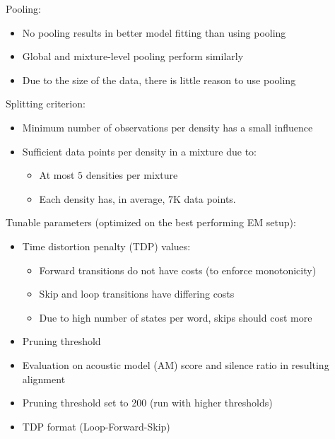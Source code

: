\documentclass[11pt, a4paper, landscape]{article}
\begin{document}
\NewPage{}
\vfill
Pooling:
\begin{itemize}
	\item No pooling results in better model fitting than using pooling 
	\item Global and mixture-level pooling perform similarly 
  \item Due to the size of the data, there is little reason to use pooling
\end{itemize}
\vspace{20pt}
Splitting criterion:
\begin{itemize}
	\item Minimum number of observations per density has a small influence
	\item Sufficient data points per density in a mixture due to:
	\begin{itemize}
		\item At most $5$ densities per mixture
		\item Each density has, in average, $7$K data points.
	\end{itemize}
\end{itemize}
\vfill

\NewPage{}
\vfill
Tunable parameters (optimized on the best performing EM setup):
\begin{itemize}
	\item Time distortion penalty (TDP) values:
    \begin{itemize}
      \item Forward transitions do not have costs (to enforce monotonicity)
      \item Skip and loop transitions have differing costs
      \item Due to high number of states per word, skips should cost more
    \end{itemize}
	\item Pruning threshold
\end{itemize}
\vfill

\NewPage{}
\vfill
\begin{itemize}
  \item Evaluation on acoustic model (AM) score and silence ratio in resulting alignment
  \item Pruning threshold set to 200 (run with higher thresholds)
  \item TDP format (Loop-Forward-Skip) 
\end{itemize}
\end{document}
